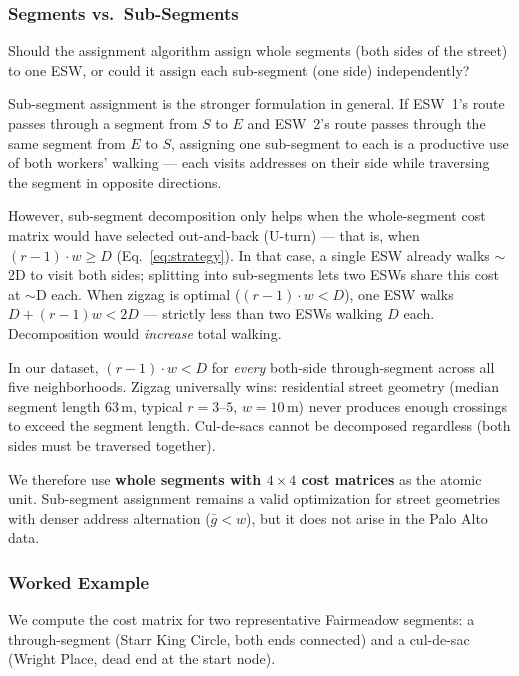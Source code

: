 \documentclass[conference]{IEEEtran}
\begin{document}
\subsubsection{Segments vs.\ Sub-Segments}
\label{sec:seg-vs-subseg}

Should the assignment algorithm assign whole segments (both sides of the street) to one ESW, or could it assign each sub-segment (one side) independently?

Sub-segment assignment is the stronger formulation in general. If ESW~1's route passes through a segment from $S$ to $E$ and ESW~2's route passes through the same segment from $E$ to $S$, assigning one sub-segment to each is a productive use of both workers' walking --- each visits addresses on their side while traversing the segment in opposite directions.

However, sub-segment decomposition only helps when the whole-segment cost matrix would have selected out-and-back (U-turn) --- that is, when $(r{-}1) \cdot w \geq D$ (Eq.~\ref{eq:strategy}). In that case, a single ESW already walks $\sim$2D to visit both sides; splitting into sub-segments lets two ESWs share this cost at $\sim$D each. When zigzag is optimal ($(r{-}1) \cdot w < D$), one ESW walks $D + (r{-}1)w < 2D$ --- strictly less than two ESWs walking $D$ each. Decomposition would \emph{increase} total walking.

In our dataset, $(r{-}1) \cdot w < D$ for \emph{every} both-side through-segment across all five neighborhoods. Zigzag universally wins: residential street geometry (median segment length 63\,m, typical $r = 3$--$5$, $w = 10$\,m) never produces enough crossings to exceed the segment length. Cul-de-sacs cannot be decomposed regardless (both sides must be traversed together).

We therefore use \textbf{whole segments with $4 \times 4$ cost matrices} as the atomic unit. Sub-segment assignment remains a valid optimization for street geometries with denser address alternation ($\bar{g} < w$), but it does not arise in the Palo Alto data.

\subsubsection{Worked Example}
\label{sec:example}

We compute the cost matrix for two representative Fairmeadow segments: a through-segment (Starr King Circle, both ends connected) and a cul-de-sac (Wright Place, dead end at the start node).
\end{document}
